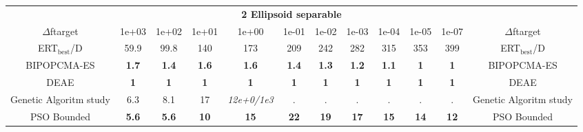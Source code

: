 \begin{tabular}{cccccccccccc}
 & \multicolumn{10}{c}{{\normalsize \textbf{2 Ellipsoid separable}}}\\
$\Delta$ftarget& 1e+03& 1e+02& 1e+01& 1e+00& 1e-01& 1e-02& 1e-03& 1e-04& 1e-05& 1e-07 & $\Delta$ftarget \\
ERT$_{\textrm{best}}$/D& 59.9& 99.8& 140& 173& 209& 242& 282& 315& 353& 399 & ERT$_{\textrm{best}}$/D \\
\hline
BIPOPCMA-ES & \textbf{1.7} & \textbf{1.4} & \textbf{1.6} & \textbf{1.6} & \textbf{1.4} & \textbf{1.3} & \textbf{1.2} & \textbf{1.1} & \textbf{1} & \textbf{1} & BIPOPCMA-ES \cite{add_an_entry_for_BIPOPCMA-ES_in_bbob.bib}\\
DEAE & \textbf{1} & \textbf{1} & \textbf{1} & \textbf{1} & \textbf{1} & \textbf{1} & \textbf{1} & \textbf{1} & \textbf{1} & \textbf{1} & DEAE \cite{add_an_entry_for_DEAE_in_bbob.bib}\\
Genetic Algoritm study & 6.3 & 8.1 & 17 & \textit{12e+0}\textit{/1e3} & . & . & . & . & . & . & Genetic Algoritm study \cite{add_an_entry_for_Genetic Algoritm study_in_bbob.bib}\\
PSO Bounded & \textbf{5.6} & \textbf{5.6} & \textbf{10} & \textbf{15} & \textbf{22} & \textbf{19} & \textbf{17} & \textbf{15} & \textbf{14} & \textbf{12} & PSO Bounded \cite{add_an_entry_for_PSO Bounded_in_bbob.bib}
\end{tabular}

